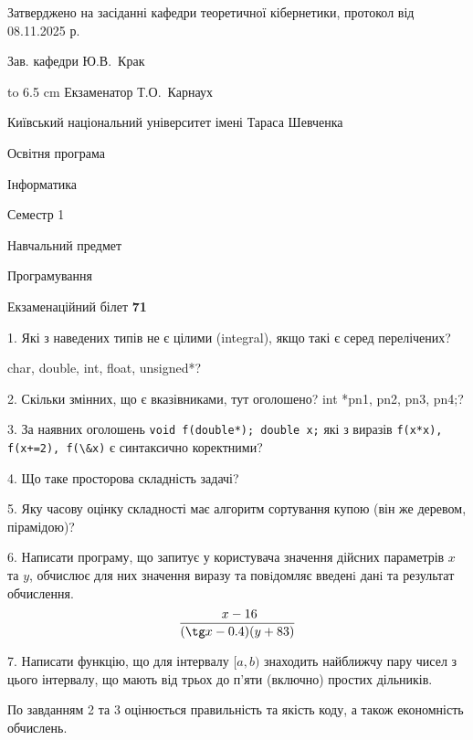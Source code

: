 \documentclass[12pt, ukrainian]{article}
\def\code#1{\Verb!#1!}
\begin{document}
{\smallskip\smallskip \begin {scriptsize} Затверджено на засіданні кафедри теоретичної кібернетики, протокол   від   08.11.2025 р.\par\smallskip\smallskip\smallskip\smallskip
{\parbox {6.5 cm} {Зав. кафедри \dotfill Ю.В.~Крак}}\hspace {0.7cm} {\hbox to 6.5 cm { Екзаменатор \dotfill Т.О.~Карнаух}} \end{scriptsize}}
\newpage
{{\begin {scriptsize}\par
{ \center  Київський національний університет імені Тараса Шевченка \par}
{\parbox {5 cm}{Освітня програма \hfill}{\parbox {7 cm}{Інформатика\hfill}}\parbox {6 cm}{\hfill Семестр 1}}\par
{\parbox {5 cm} {Навчальний предмет \hfill}\parbox {7 cm}{Програмування \hfill}\parbox {6cm}{\hfill}\par}\vspace{-15pt} \end{scriptsize}}{\center Екзаменаційний білет \No \textbf { 71 }\par}}
{%
1. Які з наведених типів не є цілими (integral), якщо такі є серед перелічених?

char, double, int, float, unsigned*?
\par
\vspace{2mm}
2. Скільки змінних, що є вказівниками, тут оголошено?
int *pn1, pn2, pn3, pn4;?
\par
\vspace{2mm}
3. За наявних оголошень \code{void f(double*); double x;} які з виразів \code{f(x*x), f(x+=2), f(\&x)} є синтаксично коректними?
\par
\vspace{2mm}
4. Що таке просторова складність задачі?
\par
\vspace{2mm}
5. Яку часову оцінку складності має алгоритм сортування купою (він же деревом, пірамідою)?
\par
\vspace{2mm}
6. Написати програму, що запитує у користувача значення дійсних параметрів $x$ та $y$, обчислює для них значення виразу та повiдомляє введенi данi та результат обчислення.
$$\frac{\ x - 16}{(\tg x - 0.4) (y + 83)}$$ 

\par
7. Написати функцію, що для інтервалу $[a, b)$ знаходить найближчу пару чисел з цього інтервалу, що мають від трьох до п'яти (включно) простих дільників.

По завданням 2 та 3 оцінюється правильність та якість коду, а також економність обчислень.

}
\end{document}
